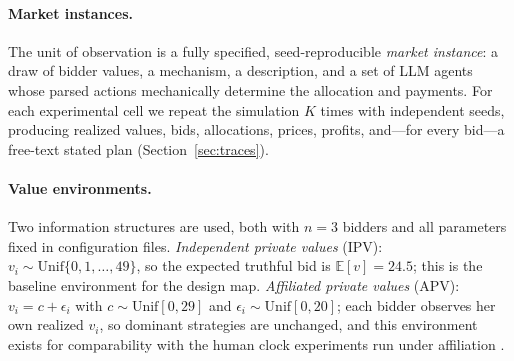 \paragraph{Market instances.}
The unit of observation is a fully specified, seed-reproducible \emph{market instance}: a draw of bidder values, a mechanism, a description, and a set of LLM agents whose parsed actions mechanically determine the allocation and payments. For each experimental cell we repeat the simulation $K$ times with independent seeds, producing realized values, bids, allocations, prices, profits, and---for every bid---a free-text stated plan (Section~\ref{sec:traces}).

\paragraph{Value environments.}
Two information structures are used, both with $n=3$ bidders and all parameters fixed in configuration files. \emph{Independent private values} (IPV): $v_i \sim \mathrm{Unif}\{0,1,\dots,49\}$, so the expected truthful bid is $\mathbb{E}[v]=24.5$; this is the baseline environment for the design map. \emph{Affiliated private values} (APV): $v_i = c + \epsilon_i$ with $c \sim \mathrm{Unif}[0,29]$ and $\epsilon_i \sim \mathrm{Unif}[0,20]$; each bidder observes her own realized $v_i$, so dominant strategies are unchanged, and this environment exists for comparability with the human clock experiments run under affiliation \citep{li2017obviously, breitmoser2022obviousness}.

